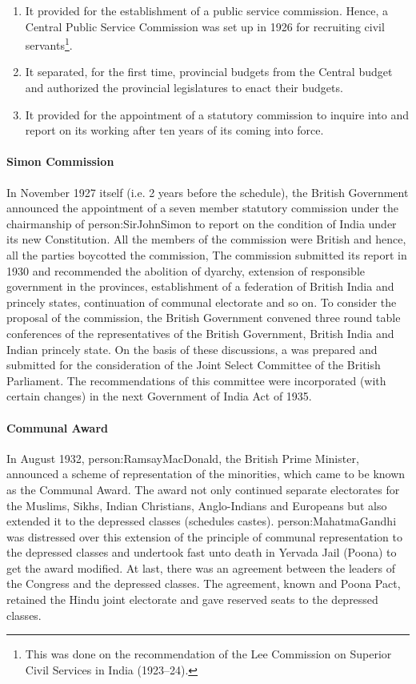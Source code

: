 \begin{enumerate}
  \item It provided for the establishment of a public service commission. Hence, a Central Public Service Commission was set up in 1926 for recruiting civil servants\footnote{This was done on the recommendation of the Lee Commission on Superior Civil Services in India (1923–24).}.
  \item It separated, for the first time, provincial budgets from the Central budget and authorized the provincial legislatures to enact their budgets.
  \item It provided for the appointment of a statutory commission to inquire into and report on its working after ten years of its coming into force.
\end{enumerate}

\paragraph{Simon Commission}

In November 1927 itself (i.e. 2 years before the schedule), the British Government announced the appointment of a seven member statutory commission under the chairmanship of \gls{person:SirJohnSimon} to report on the condition of India under its new Constitution. All the members of the commission were British and hence, all the parties boycotted the commission, The commission submitted its report in 1930 and recommended the abolition of dyarchy, extension of responsible government in the provinces, establishment of a federation of British India and princely states, continuation of communal electorate and so on. To consider the proposal of the commission, the British Government convened three round table conferences of the representatives of the British Government, British India and Indian princely state. On the basis of these discussions, a  was prepared and submitted for the consideration of the Joint Select Committee of the British Parliament. The recommendations of this committee were incorporated (with certain changes) in the next Government of India Act of 1935.

\paragraph{Communal Award}
In August 1932, \gls{person:RamsayMacDonald}, the British Prime Minister, announced a scheme of representation of the minorities, which came to be known as the Communal Award. The award not only continued separate electorates for the Muslims, Sikhs, Indian Christians, Anglo-Indians and Europeans but also extended it to the depressed classes (schedules castes). \gls{person:MahatmaGandhi} was distressed over this extension of the principle of communal representation to the depressed classes and undertook fast unto death in Yervada Jail (Poona) to get the award modified. At last, there was an agreement between the leaders of the Congress and the depressed classes. The agreement, known and Poona Pact, retained the Hindu joint electorate and gave reserved seats to the depressed classes.



